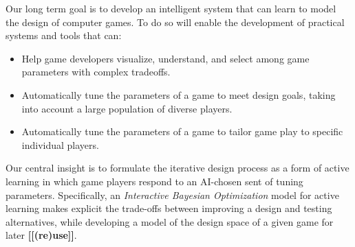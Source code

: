 \documentclass[letterpaper]{article}
\newcommand{\mytodo}[1]{\textbf{[[#1]]}}
\begin{document}
Our long term goal is to develop an intelligent system that can learn to model the design of computer games.
To do so will enable the development of practical systems and tools that can:

\begin{itemize}
\item Help game developers visualize, understand, and select among game parameters with complex tradeoffs.
\item Automatically tune the parameters of a game to meet design goals, taking into account a large population of diverse players.
\item Automatically tune the parameters of a game to tailor game play to specific individual players.
\end{itemize}

\noindent
Our central insight is to formulate the iterative design process as a form of active learning in which game players respond to an AI-chosen sent of tuning parameters.
Specifically, an {\em Interactive Bayesian Optimization} model for active learning makes explicit the trade-offs between improving a design and testing alternatives, while developing a model of the design space of a given game for later \mytodo{(re)use}.
%
\end{document}
